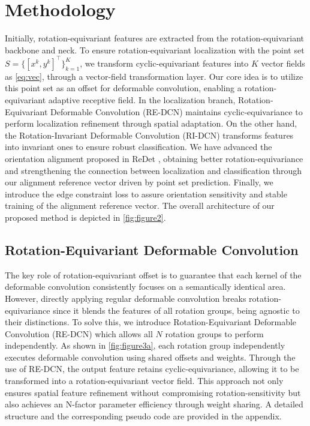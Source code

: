 \documentclass[letterpaper]{article} %
\begin{document}
\section{Methodology}
Initially, rotation-equivariant features are extracted from the rotation-equivariant backbone and neck. To ensure rotation-equivariant localization with the point set \( S = \{[x^k, y^k]^\top\}_{k=1}^K \), we transform cyclic-equivariant features into \(K\) vector fields as \cref{eq:vec}, through a vector-field transformation layer. Our core idea is to utilize this point set as an offset for deformable convolution, enabling a rotation-equivariant adaptive receptive field. In the localization branch, Rotation-Equivariant Deformable Convolution (RE-DCN) maintains cyclic-equivariance to perform localization refinement through spatial adaptation. On the other hand, the Rotation-Invariant Deformable Convolution (RI-DCN) transforms features into invariant ones to ensure robust classification. We have advanced the orientation alignment proposed in ReDet \citep{han2021ReDet}, obtaining better rotation-equivariance and strengthening the connection between localization and classification through our alignment reference vector driven by point set prediction. Finally, we introduce the edge constraint loss to assure orientation sensitivity and stable training of the alignment reference vector. The overall architecture of our proposed method is depicted in \cref{fig:figure2}.

\subsection{Rotation-Equivariant Deformable Convolution} %
The key role of rotation-equivariant offset is to guarantee that each kernel of the deformable convolution consistently focuses on a semantically identical area. However, directly applying regular deformable convolution breaks rotation-equivariance since it blends the features of all rotation groups, being agnostic to their distinctions. To solve this, we introduce Rotation-Equivariant Deformable Convolution (RE-DCN) which allows all \(N\) rotation groups to perform independently. As shown in \cref{fig:figure3a}, each rotation group independently executes deformable convolution using shared offsets and weights. Through the use of RE-DCN, the output feature retains cyclic-equivariance, allowing it to be transformed into a rotation-equivariant vector field. This approach not only ensures spatial feature refinement without compromising rotation-sensitivity but also achieves an N-factor parameter efficiency through weight sharing. A detailed structure and the corresponding pseudo code are provided in the appendix.
\end{document}
